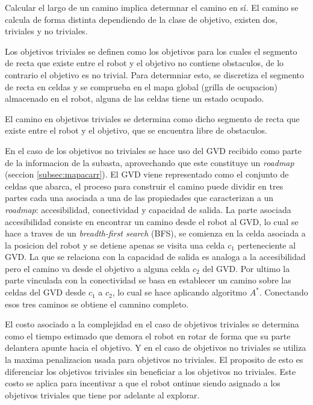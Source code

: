 Calcular el largo de un camino implica determnar el camino en sí. El camino se
calcula de forma distinta dependiendo de la clase de objetivo, existen dos,
triviales y no triviales.

Los objetivos triviales se definen como los objetivos para los cuales el
segmento de recta que existe entre el robot y el objetivo no contiene
obstaculos, de lo contrario el objetivo es no trivial. Para determniar esto, se
discretiza el segmento de recta en celdas \cite{foleyphillips} y se comprueba
en el mapa global (grilla de ocupacion) almacenado en el robot, alguna de las
celdas tiene un estado ocupado.

El camino en objetivos triviales se determina como dicho segmento de recta que
existe entre el robot y el objetivo, que se encuentra libre de obstaculos. 

En el caso de los objetivos no triviales se hace uso del GVD recibido como
parte de la informacion de la subasta, aprovechando que este constituye un
\emph{roadmap} (seccion \ref{subsec:mapacarr}). El GVD viene representado
como el conjunto de celdas que abarca, el proceso para construir el camino puede dividir 
en tres partes cada una asociada a una de las propiedades que caracterizan a un
\emph{roadmap}: accesibilidad, conectividad y capacidad de salida. La parte asociada
accesibilidad consiste en encontrar un camino desde el robot al GVD, lo cual se
hace a traves de un \emph{breadth-first search} (BFS), se comienza en la celda
asociada a la posicion del robot y se detiene apenas se visita una celda $c_1$
perteneciente al GVD. La que se relaciona con la capacidad de salida es analoga a la
accesibilidad pero el camino va desde el objetivo a alguna celda $c_2$ del GVD.
Por ultimo la parte vinculada con la conectividad se basa en establecer un
camino sobre las celdas del GVD desde $c_1$ a $c_2$, lo cual se hace aplicando
algoritmo $A^*$. Conectando esos tres caminos se obtiene el camnino completo.

El costo asociado a la complejidad en el caso de objetivos triviales se
determina como el tiempo estimado que demora el robot en rotar de forma que su
parte delantera apunte hacia el objetivo. Y en el caso de objetivos no
triviales se utiliza la maxima penalizacion usada para objetivos no triviales.
El proposito de esto es diferenciar los objetivos triviales sin beneficiar a
los objetivos no triviales. Este costo se aplica para incentivar a que el robot
ontinue siendo asignado a los objetivos triviales que tiene por adelante al
explorar.

